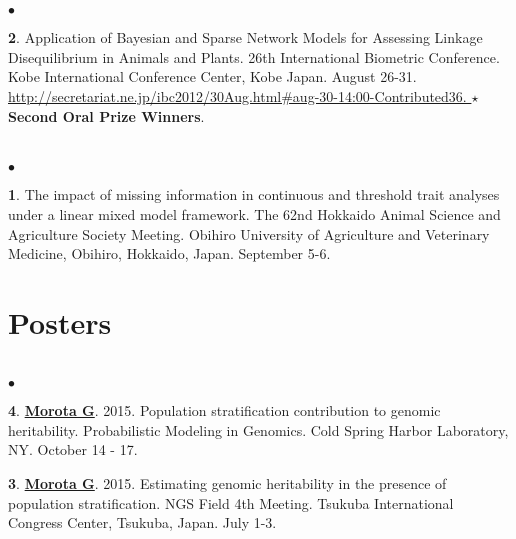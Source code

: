 \documentclass[margin,line,10pt]{res}
\newenvironment{list2}{
  \begin{list}{$\bullet$}{%
      \setlength{\itemsep}{0in}
      \setlength{\parsep}{0in} \setlength{\parskip}{0in}
      \setlength{\topsep}{0in} \setlength{\partopsep}{0in} 
      \setlength{\leftmargin}{0.2in}}}{\end{list}}
\begin{document}
\begin{resume}
\section{}
\begin{list2}
\item  [{\bf 2}.] Application of Bayesian and Sparse Network Models for Assessing Linkage Disequilibrium in Animals and Plants. 26th International Biometric Conference. Kobe International Conference Center, Kobe Japan. August 26-31.
  \textcolor{blue}{\href{http://secretariat.ne.jp/ibc2012/30Aug.html\#aug-30-14:00-Contributed36}{http://secretariat.ne.jp/ibc2012/30Aug.html\#aug-30-14:00-Contributed36. } }   {\bf $\star$Second Oral Prize Winners}.
\end{list2}


\section{}
\begin{list2}
\item  [{\bf 1}.] The impact of missing information in continuous and threshold trait analyses under a linear mixed model framework. The 62nd Hokkaido Animal Science and Agriculture Society Meeting. Obihiro University of Agriculture and Veterinary Medicine, Obihiro, Hokkaido, Japan. September 5-6.
\end{list2}


\vspace{0.5cm}
\section{ \sc Posters }
\vspace{0.5cm}
\section{}
\begin{list2}

\item  [{\bf 4}.] \textbf{\underline{Morota G}}. 2015. Population stratification contribution to genomic heritability. Probabilistic Modeling in Genomics. Cold Spring Harbor Laboratory, NY. October 14 - 17. 

  \vspace{0.5cm}
  
\item  [{\bf 3}.] \textbf{\underline{Morota G}}. 2015. Estimating genomic heritability in the presence of population stratification. NGS Field 4th Meeting. Tsukuba International Congress Center, Tsukuba, Japan. July 1-3. 
\end{list2}


\end{resume}
\end{document}
